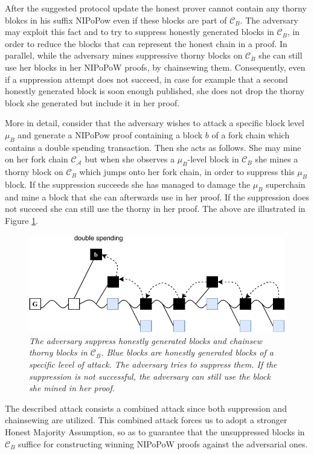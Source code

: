 After the suggested protocol update the honest prover cannot contain any thorny blokcs in his suffix NIPoPow even if these blocks are part of $\mathcal{C}_B$.  The adversary may exploit this fact and to try to suppress honestly generated blocks in $\mathcal{C}_B$, in order to reduce the blocks that can represent the honest chain in a proof. In parallel, while the adversary mines suppressive thorny blocks on $\mathcal{C}_B$ she can still use her blocks in her NIPoPoW proofs, by chainsewing them. Consequently, even if a suppression attempt does not succeed, in case for example that a second honestly generated block is soon enough published, she does not drop the thorny block she generated but include it in her proof.

More in detail, consider that the adversary wishes to attack a specific block level $\mu_B$ and generate a NIPoPow proof containing a block $b$ of a fork chain which contains a double spending transaction. Then she acts as follows. She may mine on her fork chain $\mathcal{C}_\mathcal{A}$ but when she observes a $\mu_B$-level block in $\mathcal{C}_B$ she mines a thorny block on $\mathcal{C}_B$ which jumps onto her fork chain, in order to suppress this $\mu_B$ block. If the suppression succeeds she has managed to damage the $\mu_B$ superchain and mine a block that she can afterwards use in her proof. If the suppression does not succeed she can still use the thorny in her proof. The above are illustrated in Figure \ref{fig:attack_after_update}.

\begin{figure}[h!]
	\begin{center}
    \includegraphics[scale=0.65]{figures/attack_after_update-crop.pdf}
	\end{center}
	\caption{\textit{The adversary suppress honestly generated blocks and chainsew thorny blocks in $\mathcal{C}_B$. Blue blocks are honestly generated blocks of a specific level of attack. The adversary tries to suppress them. If the suppression is not successful, the adversary can still use the block she mined in her proof.}}
	\label{fig:attack_after_update}
\end{figure}

The described attack consists a combined attack since both suppression and chainsewing are utilized. This combined attack forces us to adopt a stronger Honest Majority Assumption, so as to guarantee that the unsuppressed blocks in $\mathcal{C}_B$ suffice for constructing winning NIPoPoW proofs against the adversarial ones.